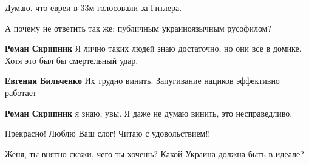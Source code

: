 \begin{itemize}
\begin{itemize}
Думаю. что евреи в 33м голосовали за Гитлера.
\end{itemize}

 
А почему не ответить так же: публичным украиноязычным русофилом?

\begin{itemize}
 
\textbf{Роман Скрипник} Я лично таких людей знаю достаточно, но они все в домике. Хотя это был бы смертельный удар.

 
\textbf{Евгения Бильченко}
Их трудно винить. Запугивание нациков эффективно работает

 
\textbf{Роман Скрипник} я знаю, увы. Я даже не думаю винить, это несправедливо.
\end{itemize}

 
Прекрасно! Люблю Ваш слог! Читаю с удовольствием!!


Женя, ты внятно скажи, чего ты хочешь? Какой Украина должна быть в идеале?


\end{itemize}
